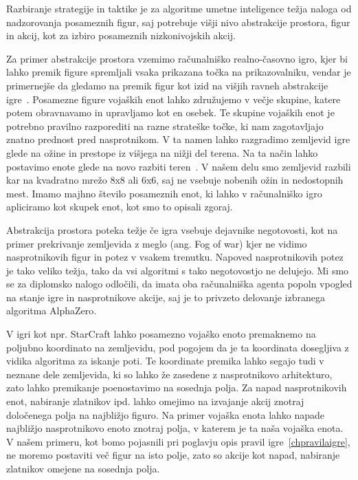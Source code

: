\documentclass[a4paper, 12pt]{book}
\begin{document}
Razbiranje strategije in taktike je za algoritme umetne inteligence težja naloga od nadzorovanja posameznih figur, saj potrebuje višji nivo abstrakcije prostora, figur in akcij, kot za izbiro posameznih nizkonivojskih akcij.

Za primer abstrakcije prostora vzemimo računalniško realno-časovno igro, kjer bi lahko premik figure spremljali vsaka prikazana točka na prikazovalniku, vendar je primernejše da gledamo na premik figur kot izid na višjih ravneh abstrakcije igre~\cite{uriarte2015automatic}.
Posamezne figure vojaških enot lahko združujemo v večje skupine, katere potem obravnavamo in upravljamo kot en osebek.
Te skupine vojaških enot je potrebno pravilno razporediti na razne strateške točke, ki nam zagotavljajo znatno prednost pred nasprotnikom.
V ta namen lahko razgradimo zemljevid igre glede na ožine in prestope iz višjega na nižji del terena.
Na ta način lahko postavimo enote glede na novo razbiti teren~\cite{uriarte2014game}.
V našem delu smo zemljevid razbili kar na kvadratno mrežo 8x8 ali 6x6, saj ne vsebuje nobenih ožin in nedostopnih mest.
Imamo majhno število posameznih enot, ki lahko v računalniško igro apliciramo kot skupek enot, kot smo to opisali zgoraj.

Abstrakcija prostora poteka težje če igra vsebuje dejavnike negotovosti, kot na primer prekrivanje zemljevida z meglo (ang. Fog of war) kjer ne vidimo nasprotnikovih figur in potez v vsakem trenutku. 
Napoved nasprotnikovih potez je tako veliko težja, tako da vsi algoritmi s tako negotovostjo ne delujejo.
Mi smo se za diplomsko nalogo odločili, da imata oba računalniška agenta popoln vpogled na stanje igre in nasprotnikove akcije, saj je to privzeto delovanje izbranega algoritma AlphaZero.

V igri kot npr. StarCraft lahko posamezno vojaško enoto premaknemo na poljubno koordinato na zemljevidu, pod pogojem da je ta koordinata dosegljiva z vidika algoritma za iskanje poti.
Te koordinate premika lahko segajo tudi v neznane dele zemljevida, ki so lahko že zasedene z nasprotnikovo arhitekturo, zato lahko premikanje poenostavimo na sosednja polja.
Za napad nasprotnikovih enot, nabiranje zlatnikov ipd. lahko omejimo na izvajanje akcij znotraj določenega polja na najbližjo figuro.
Na primer vojaška enota lahko napade najbližjo nasprotnikovo enoto znotraj polja, v katerem je ta naša vojaška enota.
V našem primeru, kot bomo pojasnili pri poglavju opis pravil igre~\ref{chpravilaigre}, ne moremo postaviti več figur na isto polje, zato so akcije kot napad, nabiranje zlatnikov omejene na sosednja polja.
\end{document}
